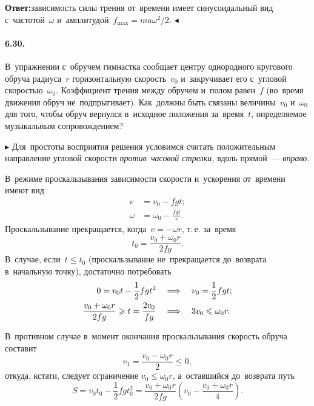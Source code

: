 \documentclass{weekly}
\begin{document}
\textbf{Ответ:}\quad зависимость силы трения от~времени
имеет синусоидальный вид с~частотой~$\omega$
и~амплитудой~$f_{\max} = ma\omega^2/2$.
\hfill $\blacktriangleleft$


\paragraph{6.30.} В~упражнении с~обручем гимнастка сообщает центру
однородного кругового обруча радиуса~$r$ горизонтальную скорость~$v_0$
и~закручивает его с~угловой скоростью~$\omega_0$.
Коэффициент трения между обручем и~полом равен~$f$
(во~время движения обруч не~подпрыгивает).
Как~должны быть связаны величины~$v_0$ и~$\omega_0$ для того,
чтобы обруч вернулся в~исходное положения за~время~$t$,
определяемое музыкальным сопровождением?

$\blacktriangleright$ Для~простоты восприятия решения
условимся считать положительным направление угловой скорости
\emph{против~часовой стрелки,} вдоль прямой~--- \emph{вправо.}

В~режиме проскальзывания зависимости скорости и~ускорения от~времени
имеют вид
\begin{align}
    v &= v_0 - fgt; \\
    \omega &= \omega_0 - \frac{fgt}{r}.
\end{align}
Проскальзывание прекращается, когда~$v = -\omega r$,
т.\,е. за~время
\begin{equation}
    t_0 = \frac{v_0 + \omega_0 r}{2fg}.
\end{equation}
В~случае, если~$t \leqslant t_0$ (проскальзывание не~прекращается
до~возврата в~начальную точку), достаточно потребовать
\begin{align}
    0 = v_0 t - \frac12 fgt^2
&\quad \Longrightarrow \quad
    v_0 = \frac12 fgt;
\\
    \frac{v_0 + \omega_0 r}{2fg} \geqslant t
            = \frac{2v_0}{fg}
&\quad \Longrightarrow \quad
    3v_0 \leqslant \omega_0 r.
\end{align}

В~противном случае в~момент окончания проскальзывания скорость
обруча составит
\begin{equation}
    v_1 = \frac{v_0 - \omega_0 r}{2} \leqslant 0,
\end{equation}
откуда, кстати, следует ограничение $v_0 \leqslant \omega_0 r$,
а~оставшийся до~возврата путь
\begin{equation}
    S = v_0 t_0 - \frac12 fg t_0^2
        = \frac{v_0 + \omega_0 r}{2fg} 
            \left(v_0 - \frac{v_0 + \omega_0 r}{4}\right).
\end{equation}
\end{document}
